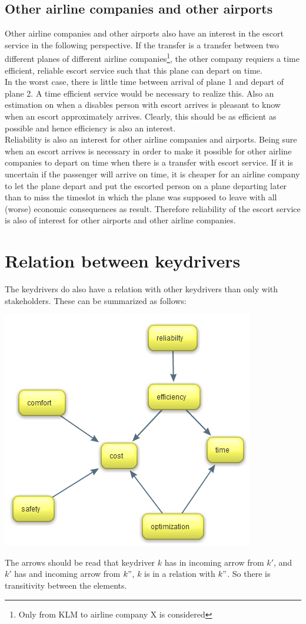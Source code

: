\documentclass[a4paper, 11pt, notitlepage]{report}
\begin{document}
\subsection{Other airline companies and other airports}
Other airline companies and other airports also have an interest in the escort service in the following perspective. If the transfer is a transfer between two different planes of different airline companies\footnote{Only from KLM to airline company X is considered}, the other company requiers a time efficient, reliable escort service such that this plane can depart on time.\\
In the worst case, there is little time between arrival of plane 1 and depart of plane 2. A time efficient service would be necessary to realize this. Also an estimation on when a disables person with escort arrives is pleasant to know when an escort approximately arrives. Clearly, this should be as efficient as possible and hence efficiency is also an interest.\\
Reliability is also an interest for other airline companies and airports. Being sure when an escort arrives is necessary in order to make it possible for other airline companies to depart on time when there is a transfer with escort service. If it is uncertain if the passenger will arrive on time, it is cheaper for an airline company to let the plane depart and put the escorted person on a plane departing later than to miss the timeslot in which the plane was supposed to leave with all (worse) economic consequences as result. Therefore reliability of the escort service is also of interest for other airports and other airline companies.
\newpage
\section{Relation between keydrivers}
The keydrivers do also have a relation with other keydrivers than only with stakeholders. These can be summarized as follows:
\begin{center}
	\includegraphics[scale=0.45]{figures/relationkeydrivers.jpg}
\end{center}
The arrows should be read that keydriver $k$ has in incoming arrow from $k'$, and $k'$ has and incoming arrow from $k"$, $k$ is in a relation with $k"$. So there is transitivity between the elements.
\end{document}
